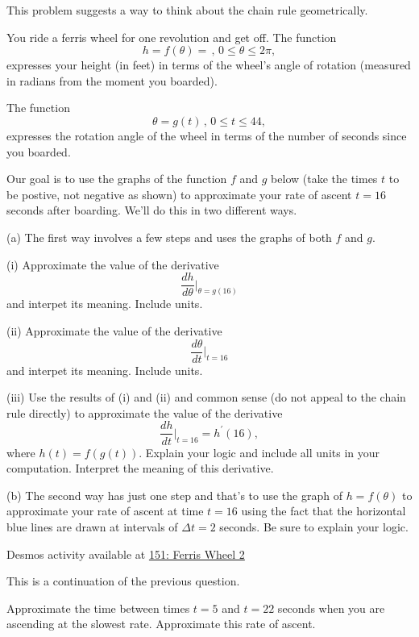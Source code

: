\documentclass{ximera}
\begin{document}
\begin{question}  \label{Ex:CHdfthghhyhpp}
This problem suggests a way to think about the chain rule geometrically.

You ride a ferris wheel for one revolution and get off. The function 
\[
    h = f(\theta) = \, , \, 0\leq \theta \leq 2\pi ,   %
\]
expresses your height (in feet) in terms of the wheel's angle of rotation (measured in radians from the moment you boarded).

The function 
\[
    \theta = g(t) \, , \, 0\leq t \leq 44, 
\]
expresses the rotation angle of the wheel in terms of the number of seconds since  you boarded.

Our goal is to use the graphs of the function $f$ and $g$ below (take the times $t$ to be postive, not negative as shown) to approximate your rate of ascent $t=16$ seconds after boarding. We'll do this in two different ways.

(a) The first way involves a few steps and uses the graphs of both $f$ and $g$. 

(i) Approximate the value of the derivative
\[
   \frac{dh}{d\theta}\Big|_{\theta = g(16)} 
\]
and interpet its meaning. Include units.

(ii) Approximate the value of the derivative 
\[
    \frac{d\theta}{dt}\Big|_{t=16} 
\]
and interpet its meaning. Include units.

(iii) Use the results of (i) and (ii) and common sense (do not appeal to the chain rule directly) to approximate the value of the derivative
\[
   \frac{dh}{dt}\Big|_{t=16}  =  h^\prime(16),
\]
where $h(t) = f(g(t))$. Explain your logic and include all units in your computation. Interpret the meaning of this derivative.

(b) The second way has just one step and that's to use the graph of $h=f(\theta)$ to approximate your rate of ascent at time $t=16$ using the fact that the horizontal blue lines are drawn at intervals of $\Delta t = 2$ seconds. Be sure to explain your logic.


\begin{onlineOnly}
    \begin{center}
\end{center}
\end{onlineOnly}

Desmos activity available at \href{https://www.desmos.com/calculator/fkgfpsowe8}{151: Ferris Wheel 2}

\end{question}

\begin{question} \label{Q:3rerfggg}
This is a continuation of the previous question.

Approximate the time between times $t=5$ and $t=22$ seconds when you are ascending at the slowest rate. Approximate this rate of ascent. 

\end{question}
\end{document}

